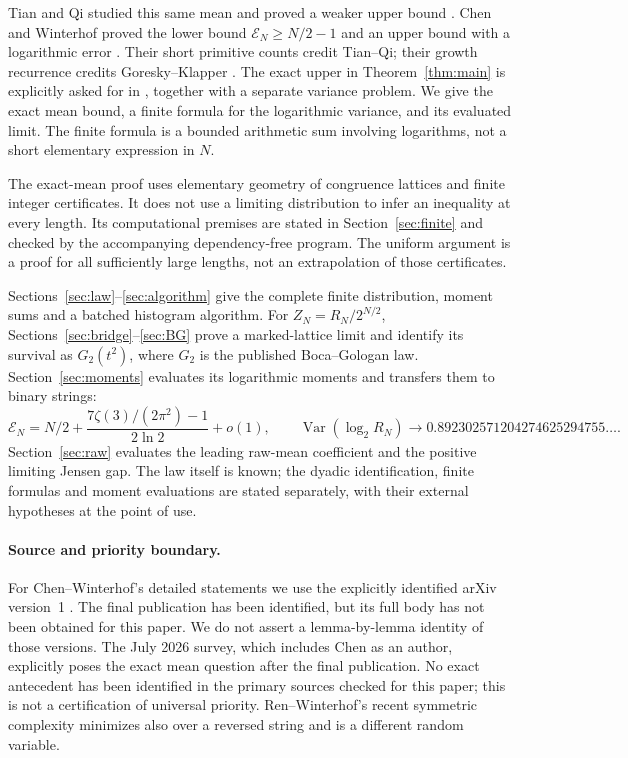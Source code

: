 \documentclass[11pt,a4paper]{article}
\numberwithin{equation}{section}
\theoremstyle{remark}
\begin{document}
Tian and Qi studied this same mean and proved a weaker upper bound
\cite[Theorem~3]{TQ}. Chen and Winterhof proved the lower bound
$\mathcal E_N\ge N/2-1$ and an upper bound with a logarithmic error
\cite[Theorems~2--3]{CWv1}. Their short primitive counts credit Tian--Qi;
their growth recurrence credits Goresky--Klapper \cite{GK}.
The exact upper in Theorem~\ref{thm:main} is explicitly asked for in
\cite[Question~3.1]{LXC}, together with a separate variance problem.
We give the exact mean bound, a finite formula for the logarithmic
variance, and its evaluated limit. The finite formula is a bounded
arithmetic sum involving logarithms, not a short elementary expression
in $N$.

The exact-mean proof uses elementary geometry of congruence lattices and finite
integer certificates. It does not use a limiting distribution to infer
an inequality at every length. Its computational premises are stated in
Section~\ref{sec:finite} and checked by the accompanying dependency-free
program. The uniform argument is a proof for all sufficiently large
lengths, not an extrapolation of those certificates.

Sections~\ref{sec:law}--\ref{sec:algorithm} give the complete finite
distribution, moment sums and a batched histogram algorithm. For
$Z_N=R_N/2^{N/2}$, Sections~\ref{sec:bridge}--\ref{sec:BG} prove a
marked-lattice limit and identify its survival as $G_2(t^2)$, where
$G_2$ is the published Boca--Gologan law. Section~\ref{sec:moments}
evaluates its logarithmic moments and transfers them to binary strings:
\[
\mathcal E_N=N/2+\frac{7\zeta(3)/(2\pi^2)-1}{2\ln2}+o(1),
\qquad \operatorname{Var}(\log_2R_N)\longrightarrow
0.892302571204274625294755\ldots.
\]
Section~\ref{sec:raw} evaluates the leading raw-mean coefficient and
the positive limiting Jensen gap. The law itself is known; the dyadic
identification, finite formulas and moment evaluations are stated
separately, with their external hypotheses at the point of use.

\paragraph{Source and priority boundary.}
For Chen--Winterhof's detailed statements we use the explicitly identified
arXiv version~1 \cite{CWv1}. The final publication \cite{CWfinal} has been
identified, but its full body has not been obtained for this paper. We do not assert a lemma-by-lemma identity of those versions.
The July 2026 survey, which includes Chen as an author, explicitly poses
the exact mean question after the final publication.
No exact antecedent has been identified in the primary sources checked
for this paper; this is not a certification of universal priority.
Ren--Winterhof's recent symmetric complexity \cite{RW} minimizes also
over a reversed string and is a different random variable.
\end{document}
